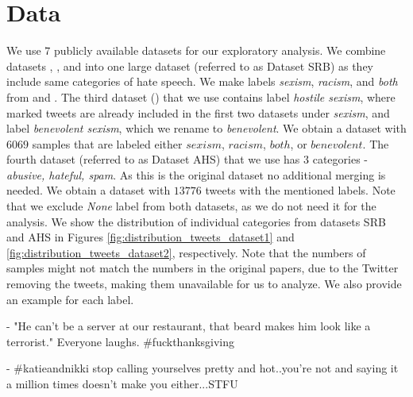 \documentclass[fleqn,moreauthors,10pt]{ds_report}
\newcommand\bm{0.2pt}
\begin{document}
\section{Data}
\label{sec:data}

We use $7$ publicly available datasets for our exploratory analysis. We combine datasets \cite{waseem2016you}, \cite{waseem2016hateful}, and \cite{jha2017does} into one large dataset (referred to as Dataset SRB) as they include same categories of hate speech. We make labels \textit{sexism}, \textit{racism}, and \textit{both} from \cite{waseem2016you} and \cite{waseem2016hateful}. The third dataset (\cite{jha2017does}) that we use contains label \textit{hostile sexism}, where marked tweets are already included in the first two datasets under \textit{sexism}, and label \textit{benevolent sexism}, which we rename to \textit{benevolent}. We obtain a dataset with $6069$ samples that are labeled either $sexism$, $racism$, $both$, or $benevolent$.
The fourth dataset (referred to as Dataset AHS)\cite{founta2018large} that we use has $3$ categories - \textit{abusive,
hateful, spam}. As this is the original dataset no additional merging is needed. We obtain a dataset with $13776$ tweets with the mentioned labels. Note that we exclude \textit{None} label from both datasets, as we do not need it for the analysis.
We show the distribution of individual categories from datasets SRB and AHS in Figures \ref{fig:distribution_tweets_dataset1} and \ref{fig:distribution_tweets_dataset2}, respectively. Note that the numbers of samples might not match the numbers in the original papers, due to the Twitter removing the tweets, making them unavailable for us to analyze. We also provide an example for each label.

\begin{tcolorbox}[colback=black!8,width=0.9\linewidth, center,arc=8pt,sharp corners=downhill, boxrule=0.3pt, left=\bm, top=\bm, right=\bm, bottom=\bm, fontupper=\small]
 - "He can't be a server at our restaurant, that beard makes him look like a terrorist." Everyone laughs. \#fuckthanksgiving
\end{tcolorbox}

\begin{tcolorbox}[colback=black!8, width=0.9\linewidth, center,arc=8pt,sharp corners=downhill, boxrule=0.3pt, left=\bm, top=\bm, right=\bm, bottom=\bm, fontupper=\small]
 - \#katieandnikki stop calling yourselves pretty and hot..you're not and saying it a million times doesn't make you either...STFU
\end{tcolorbox}
\end{document}
